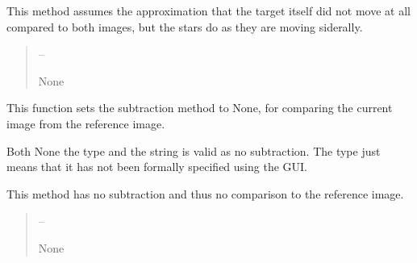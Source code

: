 \documentclass[letterpaper,11pt,english]{sphinxmanual}
\begin{document}
\begin{savenotes}
\begin{fulllineitems}
\begin{savenotes}
\begin{fulllineitems}
\sphinxAtStartPar
This method assumes the approximation that the target itself did not
move at all compared to both images, but the stars do as they are
moving siderally.
\begin{quote}\begin{description}
\sphinxAtStartPar
{} – 

\sphinxAtStartPar
None

\end{description}\end{quote}

\end{fulllineitems}\end{savenotes}


\begin{savenotes}\begin{fulllineitems}
\label{\detokenize{code/opihiexarata.gui.selector:opihiexarata.gui.selector.TargetSelectorWindow.__connect_push_button_mode_none}}
\pysigstartsignatures
{}
\pysigstopsignatures
\sphinxAtStartPar
This function sets the subtraction method to None, for comparing
the current image from the reference image.

\sphinxAtStartPar
Both None the type and the string is valid as no subtraction. The
type just means that it has not been formally specified using the GUI.

\sphinxAtStartPar
This method has no subtraction and thus no comparison to the reference
image.
\begin{quote}\begin{description}
\sphinxAtStartPar
{} – 

\sphinxAtStartPar
None

\end{description}\end{quote}

\end{fulllineitems}\end{savenotes}


\end{fulllineitems}
\end{savenotes}
\end{document}

